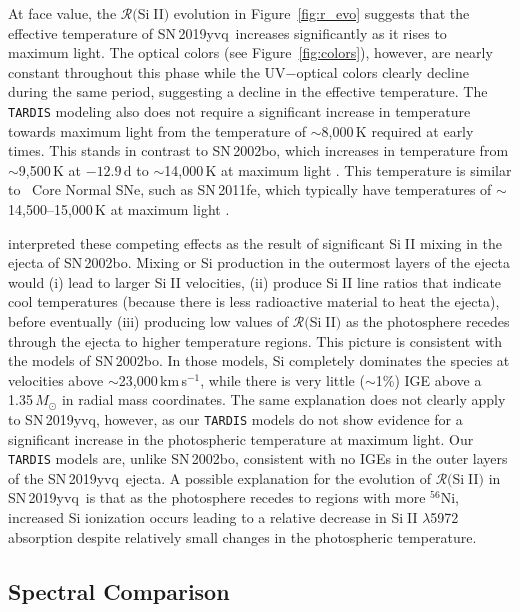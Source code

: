 \documentclass[twocolumn]{aastex63}
\def\ion#1#2{#1$\;${\footnotesize\rm{#2}}\relax}
\newcommand{\kms}{km\,s$^{-1}$}
\newcommand{\radni}{$^{56}$Ni}
\newcommand{\sn}{SN\,2019yvq}
\begin{document}
At face value, the $\mathcal{R}($\ion{Si}{II}$)$ evolution in
Figure~\ref{fig:r_evo} suggests that the effective temperature of \sn\
increases significantly as it rises to maximum light. The optical colors (see
Figure~\ref{fig:colors}), however, are nearly constant throughout this phase
while the UV$ - $optical colors clearly decline during the same period,
suggesting a decline in the effective temperature. The \texttt{TARDIS}
modeling also does not require a significant increase in temperature towards
maximum light from the temperature of $\sim$8,000\,K required at early times.
This stands in contrast to SN\,2002bo, which increases in temperature from
$\sim$9,500\,K at $-12.9$\,d to $\sim$14,000\,K at maximum light
\citep{Stehle05}. This temperature is similar to \citeauthor{Branch06}~Core
Normal SNe, such as SN\,2011fe, which typically have temperatures of
$\sim$14,500--15,000\,K at maximum light \citep{Mazzali14}.

\citet{Benetti04} interpreted these competing effects as the result of
significant \ion{Si}{II} mixing in the ejecta of SN\,2002bo. Mixing or Si
production in the outermost layers of the ejecta would (i) lead to larger
\ion{Si}{II} velocities, (ii) produce \ion{Si}{II} line ratios that indicate
cool temperatures (because there is less radioactive material to heat the
ejecta), before eventually (iii) producing low values of
$\mathcal{R}($\ion{Si}{II}$)$ as the photosphere recedes through the ejecta
to higher temperature regions. This picture is consistent with the
\citet{Stehle05} models of SN\,2002bo. In those models, Si completely
dominates the species at velocities above $\sim$23,000\,\kms, while there is
very little ($\sim$1\%) IGE above a 1.35\,$M_\odot$ in radial mass
coordinates. The same explanation does not clearly apply to \sn, however, as
our \texttt{TARDIS} models do not show evidence for a significant increase
in the photospheric temperature at maximum light. Our \texttt{TARDIS} models
are, unlike SN\,2002bo, consistent with no IGEs in the outer layers of the
\sn\ ejecta. A possible explanation for the evolution of
$\mathcal{R}($\ion{Si}{II}$)$ in \sn\ is that as the photosphere recedes to
regions with more \radni, increased Si ionization occurs leading to a
relative decrease in \ion{Si}{II} $\lambda$5972 absorption despite
relatively small changes in the photospheric temperature.

\subsection{Spectral Comparison}\label{sec:spec_comp}
\end{document}
